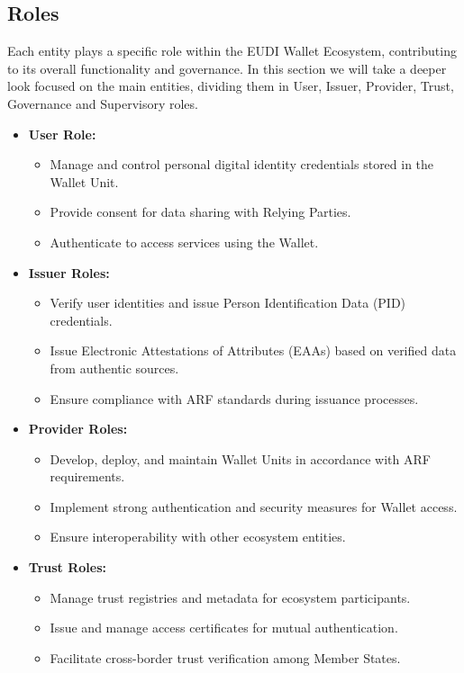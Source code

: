 \documentclass[sigconf,balance,nonacm,authordraft]{acmart}
\begin{document}
\subsection{Roles}
Each entity plays a specific role within the EUDI Wallet Ecosystem, contributing to its overall functionality and governance.
In this section we will take a deeper look focused on the main entities, dividing them in User, Issuer, Provider, Trust, Governance and Supervisory roles.
\begin{itemize}

  \item \textbf{User Role:}
    \begin{itemize}
      \item Manage and control personal digital identity credentials stored in the Wallet Unit.
      \item Provide consent for data sharing with Relying Parties.
      \item Authenticate to access services using the Wallet.
    \end{itemize}

  \item \textbf{Issuer Roles:}
    \begin{itemize}
      \item Verify user identities and issue Person Identification Data (PID) credentials.
      \item Issue Electronic Attestations of Attributes (EAAs) based on verified data from authentic sources.
      \item Ensure compliance with ARF standards during issuance processes.
    \end{itemize}

  \item \textbf{Provider Roles:}
    \begin{itemize}
      \item Develop, deploy, and maintain Wallet Units in accordance with ARF requirements.
      \item Implement strong authentication and security measures for Wallet access.
      \item Ensure interoperability with other ecosystem entities.
    \end{itemize}

  \item \textbf{Trust Roles:}
    \begin{itemize}
      \item Manage trust registries and metadata for ecosystem participants.
      \item Issue and manage access certificates for mutual authentication.
      \item Facilitate cross-border trust verification among Member States.
    \end{itemize}


\end{itemize}
\end{document}

